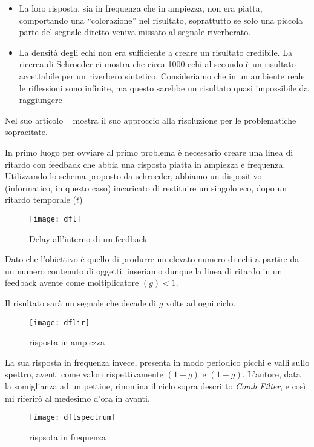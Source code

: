 \begin{itemize}
\item La loro risposta, sia in frequenza che in ampiezza, non era piatta,
      comportando una “colorazione” nel risultato, soprattutto se solo una
      piccola parte del segnale diretto veniva missato al segnale riverberato.
\item La densità degli echi non era sufficiente a creare un risultato credibile.
      La ricerca di Schroeder ci mostra che circa 1000 echi al secondo è un
      risultato accettabile per un riverbero sintetico. Consideriamo che in un
      ambiente reale le riflessioni sono infinite, ma questo sarebbe un risultato
      quasi impossibile da raggiungere
\end{itemize}

Nel suo articolo \ms~ mostra il suo approccio alla risoluzione per le
problematiche sopracitate.

In primo luogo per ovviare al primo problema è necessario creare una linea di
ritardo con feedback che abbia una risposta piatta in ampiezza e frequenza.
Utilizzando lo schema proposto da schroeder, abbiamo un dispositivo
(informatico, in questo caso) incaricato di restituire un singolo eco, dopo un
ritardo temporale ($t$)

\begin{figure}[htp]
\centering
\texttt{[image: dfl]}
\caption{Delay all'interno di un feedback}
\label{fig:dfl}
\end{figure}

Dato che l'obiettivo è quello di produrre un elevato numero di echi a partire
da un numero contenuto di oggetti, inseriamo dunque la linea di ritardo in un
feedback avente come moltiplicatore $(g) < 1$.

Il risultato sarà un segnale che decade di $g$ volte ad ogni ciclo.

\begin{figure}[htp]
\centering
\texttt{[image: dflir]}
\caption{risposta in ampiezza}
\label{fig:dflir}
\end{figure}

La sua risposta in frequenza invece, presenta in modo periodico picchi e valli
sullo spettro, aventi come valori rispettivamente $(1+g)$ e $(1-g)$. L’autore,
data la somiglianza ad un pettine, rinomina il ciclo sopra descritto
\emph{Comb Filter}, e così mi riferirò al medesimo d’ora in avanti.

\begin{figure}[htp]
\centering
\texttt{[image: dflspectrum]}
\caption{rispsota in frequenza}
\label{fig:dflspectrum}
\end{figure}

